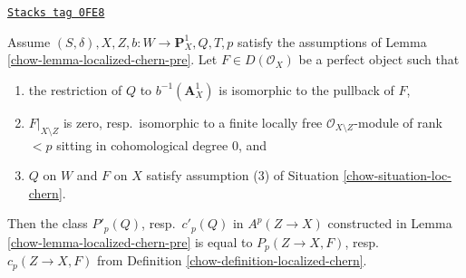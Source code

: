 \begin{lemma}
\label{chow-lemma-independent-loc-chern-bQ}
\href{https://stacks.math.columbia.edu/tag/0FE8}{\texttt{Stacks tag 0FE8}}

Assume $(S, \delta), X, Z, b : W \to \mathbf{P}^1_X, Q, T, p$
satisfy the assumptions of Lemma \ref{chow-lemma-localized-chern-pre}.
Let $F \in D(\mathcal{O}_X)$ be a perfect object such that
\begin{enumerate}
\item the restriction of $Q$ to $b^{-1}(\mathbf{A}^1_X)$ is
isomorphic to the pullback of $F$,
\item $F|_{X \setminus Z}$ is zero, resp.\ isomorphic to a finite
locally free $\mathcal{O}_{X \setminus Z}$-module of rank $< p$
sitting in cohomological degree $0$, and
\item $Q$ on $W$ and $F$ on $X$ satisfy assumption (3) of
Situation \ref{chow-situation-loc-chern}.
\end{enumerate}
Then the class $P'_p(Q)$, resp.\ $c'_p(Q)$ in $A^p(Z \to X)$ constructed
in Lemma \ref{chow-lemma-localized-chern-pre}
is equal to $P_p(Z \to X, F)$, resp.\ $c_p(Z \to X, F)$
from Definition \ref{chow-definition-localized-chern}.
\end{lemma}

